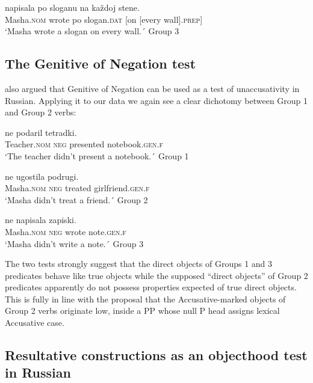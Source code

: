 \documentclass[output=paper,colorlinks,citecolor=brown,nonflat]{./langscibook}
\begin{document}
\ea%
    \label{ex:antonyuk:24}
                 {napisala} {po} {sloganu}        {na}  {každoj} {stene}.\\
    Masha.\textsc{nom}   wrote     po slogan.\textsc{dat} [on [every  wall].\textsc{prep}]\\
    \glt `Masha wrote a slogan on every wall.´ \hfill{Group 3}
    \z

\subsection{The Genitive of Negation test}\label{sec:antonyuk:3.2}

\citet{Pesetsky1982} also argued that Genitive of Negation can be used as a test of unaccusativity in Russian. Applying it to our data we again see a clear dichotomy between Group 1 and Group 2 verbs:

\ea%
    \label{ex:antonyuk:25}
               {ne}      {podaril}     {tetradki}.\\
    Teacher.\textsc{nom} \textsc{neg} presented notebook.\textsc{gen.f}\\
    \glt `The teacher didn’t present a notebook.´ \hfill{Group 1}
    \z

\ea%
    \label{ex:antonyuk:26}
               {ne}        {ugostila} {podrugi}.\\
    Masha.\textsc{nom}   \textsc{neg}  treated  girlfriend.\textsc{gen.f}\\
    \glt `Masha didn’t treat a friend.´ \hfill{Group 2}
    \z

\ea%
    \label{ex:antonyuk:27}
                {ne}     {napisala} {zapiski}.\\
    Masha.\textsc{nom}  \textsc{neg} wrote      note.\textsc{gen.f}\\
    \glt `Masha didn’t write a note.´ \hfill{Group 3}
    \z

The two tests strongly suggest that the direct objects of Groups 1 and 3 predicates behave like true objects while the supposed “direct objects” of Group 2 predicates apparently do not possess properties expected of true direct objects. This is fully in line with the proposal that the Accusative-marked objects of Group 2 verbs originate low, inside a PP whose null P head assigns lexical Accusative case.

\subsection{Resultative constructions as an objecthood test in Russian}\label{sec:antonyuk:3.3}
\end{document}
